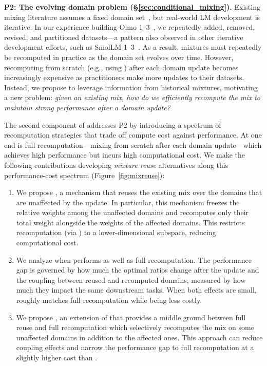 \textbf{P2: The evolving domain problem (\S\ref{sec:conditional_mixing}).} 
Existing mixing literature assumes a fixed domain set~\citep{albalak2024surveydataselectionlanguage}, but real-world LM development is iterative. 
In our experience building Olmo 1--3~\citep{olmo2025olmo3}, we repeatedly added, removed, revised, and partitioned datasets---a pattern also observed in other iterative development efforts, such as SmolLM 1--3~\citep{bakouch2025smollm3}.
As a result, mixtures must repeatedly be recomputed in practice as the domain set evolves over time. 
However, recomputing from scratch (e.g., using \base) after each domain update becomes increasingly expensive as practitioners make more updates to their datasets. 
Instead, we propose to leverage information from historical mixtures, motivating a new problem: \emph{given an existing mix, how do we efficiently recompute the mix to maintain strong performance after a domain update?} 


The second component of \olmix addresses P2 by introducing a spectrum of recomputation strategies that trade off compute cost against performance. At one end is full recomputation---mixing from scratch after each domain update---which achieves high performance but incurs high computational cost. We make the following contributions developing \textit{mixture reuse} alternatives along this performance-cost spectrum (Figure~\ref{fig:mixreuse}):
\begin{enumerate}[itemsep=0.00pt,topsep=0pt,leftmargin=12pt]
\item We propose \fullmixreuse, a mechanism that reuses the existing mix over the domains that are unaffected by the update. In particular, this mechanism freezes the relative weights among the unaffected domains and recomputes only their total weight alongside the weights of the affected domains. This restricts recomputation (via \base) to a lower-dimensional subspace, reducing computational cost.
\item We analyze when \fullmixreuse performs as well as full recomputation. The performance gap is governed by how much the optimal ratios change after the update and the coupling between reused and recomputed domains, measured by how much they impact the same downstream tasks. 
When both effects are small, \fullmixreuse roughly matches full recomputation while being less costly.
\item We propose \partialmixreuse, an extension of \fullmixreuse that provides a middle ground between full reuse and full recomputation which selectively recomputes the mix on some unaffected domains in addition to the affected ones. This approach can reduce coupling effects and narrow the performance gap to full recomputation at a slightly higher cost than \fullmixreuse.
\end{enumerate}
 
